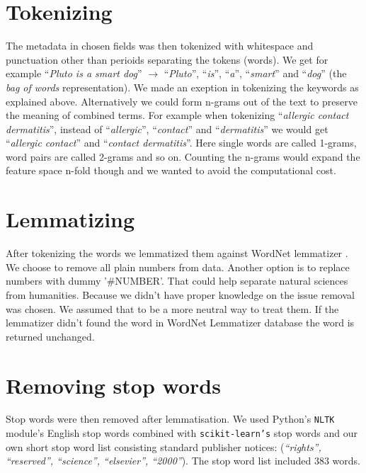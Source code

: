 \section{Tokenizing}
The metadata in chosen fields was then tokenized with whitespace 
and punctuation other than perioids separating the tokens (words). 
We get for example ``\emph{Pluto is a smart dog}'' $\rightarrow$ 
``\emph{Pluto}'', ``\emph{is}'', ``\emph{a}'', ``\emph{smart}'' 
and ``\emph{dog}'' (the \emph{bag of words} representation).
We made an exeption in tokenizing the keywords as explained above.
Alternatively we could form n-grams out of the text to preserve 
the meaning of combined terms. For example when tokenizing 
``\emph{allergic contact dermatitis}'', instead of 
``\emph{allergic}'', ``\emph{contact}'' and 
``\emph{dermatitis}'' we would get ``\emph{allergic contact}'' 
and ``\emph{contact dermatitis}''. Here single words are called 
1-grams, word pairs are called 2-grams and so on. Counting the 
n-grams would expand the feature space n-fold though and we wanted 
to avoid the computational cost. 

\section{Lemmatizing}
After tokenizing the words we lemmatized them against WordNet 
lemmatizer \cite{noauthor_princeton_2010}.
We choose to remove all plain numbers from
data. Another option is to replace numbers with dummy '\#NUMBER'.
That could help separate natural sciences from humanities. Because 
we didn't have proper knowledge on the issue removal was chosen. 
We assumed that to be a more neutral way to treat them. 
If the lemmatizer didn't found the word in WordNet Lemmatizer 
database the word is returned unchanged. 

\section{Removing stop words}
Stop words were then removed after lemmatisation. We used Python's
\texttt{NLTK} module's English stop words combined with 
\texttt{scikit-learn's} stop words and our own short stop word 
list consisting standard publisher notices: (\emph{``rights'', 
``reserved'', ``science'', ``elsevier'', ``2000''}). The stop word 
list included $383$ words.



